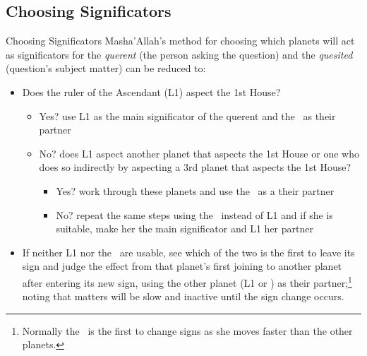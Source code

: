 \subsection{Choosing Significators}
\begin{frame}[t]{Choosing Significators}
Masha'Allah's method for choosing which planets will act as significators for the \textsl{querent} (the person asking the question) and the \textsl{quesited} (question's subject matter) can be reduced to:
\begin{itemize}
\item Does the ruler of the Ascendant (L1) aspect the 1st House?
	\begin{itemize}
		\item Yes? use L1 as the main significator of the querent and the \Moon\ as their partner
		\item No? does L1 aspect another planet that aspects the 1st House or one who does so indirectly by aspecting a 3rd planet that aspects the 1st House?
			\begin{itemize}
				\item Yes? work through these planets and use the \Moon\ as a their partner
				\item No? repeat the same steps using the \Moon\ instead of L1 and if she is suitable, make her the main significator and L1 her partner
			\end{itemize}
	\end{itemize}
\item If neither L1 nor the \Moon\ are usable, see which of the two is the first to leave its sign and judge the effect from that planet's first joining to another planet after entering its new sign, using the other planet (L1 or \Moon) as their partner;\footnote{Normally the \Moon\ is the first to change signs as she moves faster than the other planets.} noting that matters will be slow and inactive until the sign change occurs.
\end{itemize}

\end{frame}

